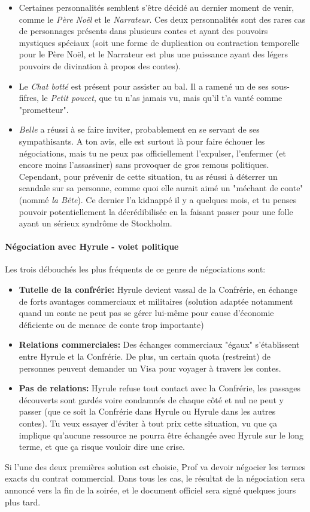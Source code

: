 {\begin{itemize}
		\item Certaines personnalités semblent s'être décidé au dernier moment de venir, comme le \emph{Père Noël} et le \emph{Narrateur}. Ces deux personnalités sont des rares cas de personnages présents dans plusieurs contes et ayant des pouvoirs mystiques spéciaux (soit une forme de duplication ou contraction temporelle pour le Père Noël, et le Narrateur est plus une puissance ayant des légers pouvoirs de divination à propos des contes).
		
		\item Le \emph{Chat botté} est présent pour assister au bal. Il a ramené un de ses sous-fifres, le \emph{Petit poucet}, que tu n'as jamais vu, mais qu'il t'a vanté comme "prometteur".
		
		\item \emph{Belle} a réussi à se faire inviter, probablement en se servant de ses sympathisants. A ton avis, elle est surtout là pour faire échouer les négociations, mais tu ne peux pas officiellement l'expulser, l'enfermer (et encore moins l'assassiner) sans provoquer de gros remous politiques. Cependant, pour prévenir de cette situation, tu as réussi à déterrer un scandale sur sa personne, comme quoi elle aurait aimé un "méchant de conte" (nommé \emph{la Bête}). Ce dernier l'a kidnappé il y a quelques mois, et tu penses pouvoir potentiellement la décrédibilisée en la faisant passer pour une folle ayant un sérieux syndrôme de Stockholm.
	\end{itemize}
	
	\paragraph{Négociation avec Hyrule - volet politique} Les trois débouchés les plus fréquents de ce genre de négociations sont:
	\begin{itemize}
		\item \textbf{Tutelle de la confrérie:} Hyrule devient vassal de la Confrérie, en échange de forts avantages commerciaux et militaires (solution adaptée notamment quand un conte ne peut pas se gérer lui-même pour cause d'économie déficiente ou de menace de conte trop importante)
		\item \textbf{Relations commerciales:} Des échanges commerciaux "égaux" s'établissent entre Hyrule et la Confrérie. De plus, un certain quota (restreint) de personnes peuvent demander un Visa pour voyager à travers les contes.
		\item \textbf{Pas de relations:} Hyrule refuse tout contact avec la Confrérie, les passages découverts sont gardés voire condamnés de chaque côté et nul ne peut y passer (que ce soit la Confrérie dans Hyrule ou Hyrule dans les autres contes). Tu veux essayer d'éviter à tout prix cette situation, vu que ça implique qu'aucune ressource ne pourra être échangée avec Hyrule sur le long terme, et que ça risque vouloir dire une crise.
	\end{itemize}
	Si l'une des deux premières solution est choisie, Prof va devoir négocier les termes exacts du contrat commercial. Dans tous les cas, le résultat de la négociation sera annoncé vers la fin de la soirée, et le document officiel sera signé quelques jours plus tard.
}
